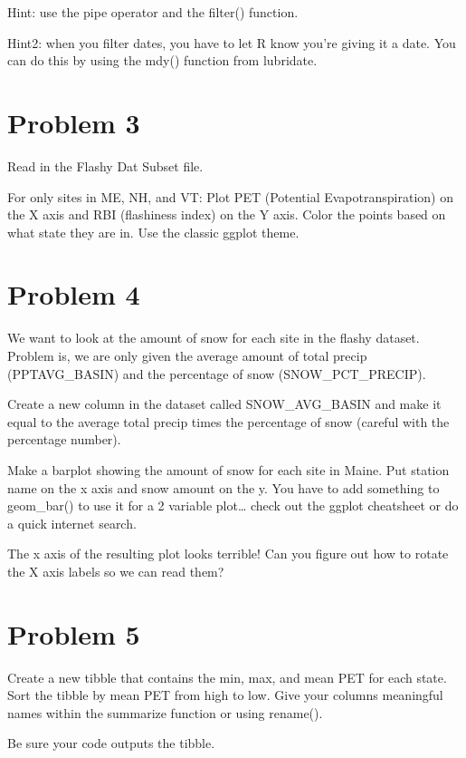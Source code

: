 \documentclass[
]{book}
\begin{document}
Hint: use the pipe operator and the filter() function.

Hint2: when you filter dates, you have to let R know you're giving it a date. You can do this by using the mdy() function from lubridate.

\hypertarget{problem-3}{%
\section{Problem 3}\label{problem-3}}

Read in the Flashy Dat Subset file.

For only sites in ME, NH, and VT: Plot PET (Potential Evapotranspiration) on the X axis and RBI (flashiness index) on the Y axis. Color the points based on what state they are in. Use the classic ggplot theme.

\hypertarget{problem-4}{%
\section{Problem 4}\label{problem-4}}

We want to look at the amount of snow for each site in the flashy dataset. Problem is, we are only given the average amount of total precip (PPTAVG\_BASIN) and the percentage of snow (SNOW\_PCT\_PRECIP).

Create a new column in the dataset called SNOW\_AVG\_BASIN and make it equal to the average total precip times the percentage of snow (careful with the percentage number).

Make a barplot showing the amount of snow for each site in Maine. Put station name on the x axis and snow amount on the y. You have to add something to geom\_bar() to use it for a 2 variable plot\ldots{} check out the ggplot cheatsheet or do a quick internet search.

The x axis of the resulting plot looks terrible! Can you figure out how to rotate the X axis labels so we can read them?

\hypertarget{problem-5}{%
\section{Problem 5}\label{problem-5}}

Create a new tibble that contains the min, max, and mean PET for each state. Sort the tibble by mean PET from high to low. Give your columns meaningful names within the summarize function or using rename().

Be sure your code outputs the tibble.
\end{document}
